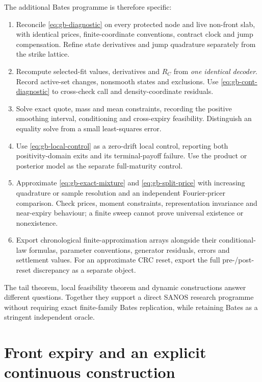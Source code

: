 \documentclass[11pt,a4paper]{article}
\numberwithin{equation}{section}
\theoremstyle{definition}\newtheorem{definition}[theorem]{Definition}
\theoremstyle{remark}\newtheorem{remark}[theorem]{Remark}
\begin{document}
The additional Bates programme is therefore specific:
\begin{enumerate}
\item Reconcile \eqref{eq:gb-diagnostic} on every protected node and live non-front slab, with identical prices, finite-coordinate conventions, contract clock and jump compensation. Refine state derivatives and jump quadrature separately from the strike lattice.
\item Recompute selected-fit values, derivatives and $R_C$ from \emph{one identical decoder}. Record active-set changes, nonsmooth states and exclusions. Use \eqref{eq:gb-cont-diagnostic} to cross-check call and density-coordinate residuals.
\item Solve exact quote, mass and mean constraints, recording the positive smoothing interval, conditioning and cross-expiry feasibility. Distinguish an equality solve from a small least-squares error.
\item Use \eqref{eq:gb-local-control} as a zero-drift local control, reporting both positivity-domain exits and its terminal-payoff failure. Use the product or posterior model as the separate full-maturity control.
\item Approximate \eqref{eq:gb-exact-mixture} and \eqref{eq:gb-split-price} with increasing quadrature or sample resolution and an independent Fourier-pricer comparison. Check prices, moment constraints, representation invariance and near-expiry behaviour; a finite sweep cannot prove universal existence or nonexistence.
\item Export chronological finite-approximation arrays alongside their conditional-law formulas, parameter conventions, generator residuals, errors and settlement values. For an approximate CRC reset, export the full pre-/post-reset discrepancy as a separate object.
\end{enumerate}
The tail theorem, local feasibility theorem and dynamic constructions answer different questions. Together they support a direct SANOS research programme without requiring exact finite-family Bates replication, while retaining Bates as a stringent independent oracle.


\section{Front expiry and an explicit continuous construction}
\label{sec:front}
\end{document}
